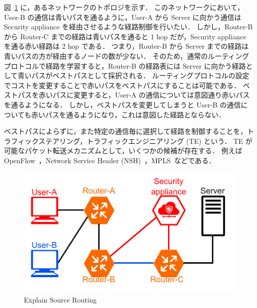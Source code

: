 図~\ref*{fig:exp-src-rtng} に，あるネットワークのトポロジを示す．
このネットワークにおいて，User-B の通信は青いパスを通るように，User-A から Server に向かう通信は Security appliance を経由させるような経路制御を行いたい．
しかし，Router-B から Router-C までの経路は青いパスを通ると 1 hop だが，Security appliance を通る赤い経路は 2 hop である．
つまり，Router-B から Server までの経路は青いパスの方が経由するノードの数が少ない．
そのため，通常のルーティングプロトコルで経路を学習すると，Router-B の経路表には Server に向かう経路として青いパスがベストパスとして採択される．
ルーティングプロトコルの設定でコストを変更することで赤いパスをベストパスにすることは可能である．
ベストパスを赤いパスに変更すると，User-A の通信については意図通り赤いパスを通るようになる．
しかし，ベストパスを変更してしまうと User-B の通信についても赤いパスを通るようになり，これは意図した経路とならない．

ベストパスによらずに，また特定の通信毎に選択して経路を制御することを，トラフィックステアリング，トラフィックエンジニアリング (TE) という．
TE が可能なパケット転送メカニズムとして，いくつかの候補が存在する．
例えば OpenFlow~\cite{openflow}，Network Service Header (NSH)~\cite{rfc8300}，MPLS~\cite{rfc3031}などである．

\begin{figure}[t]
    \centering
    \includegraphics[width=0.95\linewidth]{img/ExplainSrcRtng.pdf}
    \caption{Explain Source Routing}
    \label{fig:exp-src-rtng}
\end{figure}

